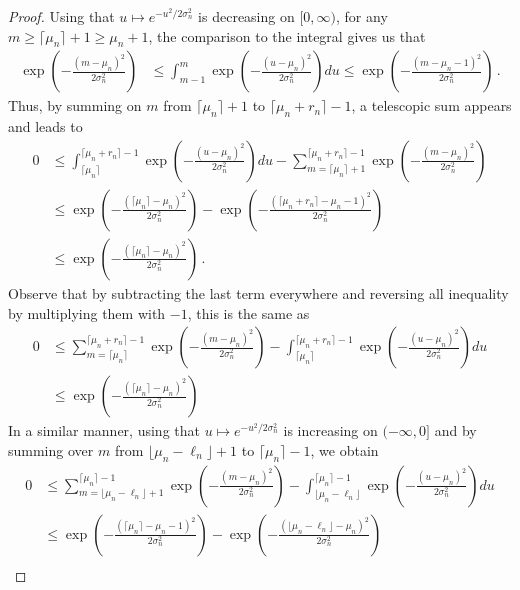\documentclass{article}
\newcommand{\1}{\mathbbm{1}}								%
\theoremstyle{definition}
\numberwithin{equation}{section}
\begin{document}
\begin{proof}
    Using that $u\mapsto e^{-u^2/2\sigma_n^2}$ is decreasing on $[0,\infty)$, for any $m\geq\lceil\mu_n\rceil+1\geq\mu_n+1$, the comparison to the integral gives us that
    \begin{align*}
        \exp\left(-\frac{(m-\mu_n)^2}{2\sigma_n^2}\right)&\leq\int_{m-1}^m\exp\left(-\frac{(u-\mu_n)^2}{2\sigma_n^2}\right)du\leq\exp\left(-\frac{(m-\mu_n-1)^2}{2\sigma_n^2}\right)\,.
    \end{align*}
    Thus, by summing on $m$ from $\lceil\mu_n\rceil+1$ to $\lceil\mu_n+r_n\rceil-1$, a telescopic sum appears and leads to
    \begin{align*}
        0&\leq\int_{\lceil\mu_n\rceil}^{\lceil\mu_n+r_n\rceil-1}\exp\left(-\frac{(u-\mu_n)^2}{2\sigma_n^2}\right)du-\sum_{m=\lceil\mu_n\rceil+1}^{\lceil\mu_n+r_n\rceil-1}\exp\left(-\frac{(m-\mu_n)^2}{2\sigma_n^2}\right)\\
        &\leq\exp\left(-\frac{(\lceil\mu_n\rceil-\mu_n)^2}{2\sigma_n^2}\right)-\exp\left(-\frac{(\lceil\mu_n+r_n\rceil-\mu_n-1)^2}{2\sigma_n^2}\right)\\
        &\leq\exp\left(-\frac{(\lceil\mu_n\rceil-\mu_n)^2}{2\sigma_n^2}\right)\,.
    \end{align*}
    Observe that by subtracting the last term everywhere and reversing all inequality by multiplying them with $-1$, this is the same as
    \begin{align*}
        0&\leq\sum_{m=\lceil\mu_n\rceil}^{\lceil\mu_n+r_n\rceil-1}\exp\left(-\frac{(m-\mu_n)^2}{2\sigma_n^2}\right)-\int_{\lceil\mu_n\rceil}^{\lceil\mu_n+r_n\rceil-1}\exp\left(-\frac{(u-\mu_n)^2}{2\sigma_n^2}\right)du\\
        &\leq\exp\left(-\frac{(\lceil\mu_n\rceil-\mu_n)^2}{2\sigma_n^2}\right)
    \end{align*}
    In a similar manner, using that $u\mapsto e^{-u^2/2\sigma_n^2}$ is increasing on $(-\infty,0]$ and by summing over $m$ from $\lfloor\mu_n-\ell_n\rfloor+1$ to $\lceil\mu_n\rceil-1$, we obtain
    \begin{align*}
        0&\leq\sum_{m=\lfloor\mu_n-\ell_n\rfloor+1}^{\lceil\mu_n\rceil-1}\exp\left(-\frac{(m-\mu_n)^2}{2\sigma_n^2}\right)-\int_{\lfloor\mu_n-\ell_n\rfloor}^{\lceil\mu_n\rceil-1}\exp\left(-\frac{(u-\mu_n)^2}{2\sigma_n^2}\right)du\\
        &\leq\exp\left(-\frac{(\lceil\mu_n\rceil-\mu_n-1)^2}{2\sigma_n^2}\right)-\exp\left(-\frac{(\lfloor\mu_n-\ell_n\rfloor-\mu_n)^2}{2\sigma_n^2}\right)\\

\end{align*}
\end{proof}
\end{document}
